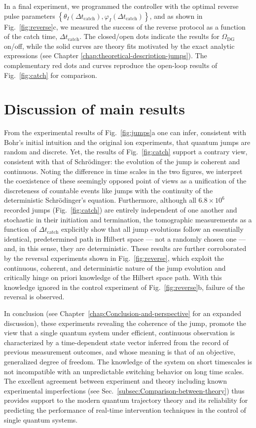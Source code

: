In a final experiment, we programmed the controller with the optimal
reverse pulse parameters $\left\{ \theta_{I}\left(\Delta t_{\mathrm{catch}}\right),\varphi_{I}\left(\Delta t_{\mathrm{catch}}\right)\right\} $,
and as shown in Fig.~\ref{fig:reverse}c, we measured the success
of the reverse protocol as a function of the catch time, $\Delta t_{\mathrm{catch}}$.
The closed/open dots indicate the results for $\Omega_{\mathrm{DG}}$
on/off, while the solid curves are theory fits motivated by the exact
analytic expressions (see Chapter \ref{chap:theoretical-description-jumps}).
The complementary red dots and curves reproduce the open-loop results
of Fig.~\ref{fig:catch} for comparison.

\section{Discussion of main results\label{sec:Discussion-of-main-results}}

From the experimental results of Fig.~\ref{fig:jumps}a one can infer,
consistent with Bohr's initial intuition and the original ion experiments,
that quantum jumps are random and discrete. Yet, the results of Fig.~\ref{fig:catch}
support a contrary view, consistent with that of Schrödinger: the
evolution of the jump is coherent and continuous. Noting the difference
in time scales in the two figures, we interpret the coexistence of
these seemingly opposed point of views as a unification of the discreteness
of countable events like jumps with the continuity of the deterministic
Schrödinger’s equation. Furthermore, although all $6.8\times10^{6}$
recorded jumps (Fig.~\ref{fig:catch}) are entirely independent of
one another and stochastic in their initiation and termination, the
tomographic measurements as a function of $\Delta t_{\mathrm{catch}}$
explicitly show that all jump evolutions follow an essentially identical,
predetermined path in Hilbert space --- not a randomly chosen one
--- and, in this sense, they are deterministic. These results are
further corroborated by the reversal experiments shown in Fig.~\ref{fig:reverse},
which exploit the continuous, coherent, and deterministic nature of
the jump evolution and critically hinge on priori knowledge of the
Hilbert space path. With this knowledge ignored in the control experiment
of Fig.~\ref{fig:reverse}b, failure of the reversal is observed.

In conclusion (see Chapter~\ref{chap:Conclusion-and-perspective}
for an expanded discussion), these experiments revealing the coherence
of the jump, promote the view that a single quantum system under efficient,
continuous observation is characterized by a time-dependent state
vector inferred from the record of previous measurement outcomes,
and whose meaning is that of an objective, generalized degree of freedom.
The knowledge of the system on short timescales is not incompatible
with an unpredictable switching behavior on long time scales. The
excellent agreement between experiment and theory including known
experimental imperfections (see Sec.~\ref{subsec:Comparison-between-theory})
thus provides support to the modern quantum trajectory theory and
its reliability for predicting the performance of real-time intervention
techniques in the control of single quantum systems.

